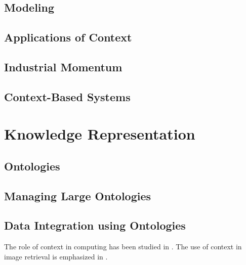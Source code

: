 \subsection{Modeling}

\subsection{Applications of Context}

\subsection{Industrial Momentum}

\subsection{Context-Based Systems}

\section{Knowledge Representation}

\subsection{Ontologies}

\subsection{Managing Large Ontologies}

\subsection{Data Integration using Ontologies}

The role of context in computing has been studied in \cite{chen2000survey}. The use of context in image retrieval is emphasized in \cite{jain2010content, datta2008image}. 

